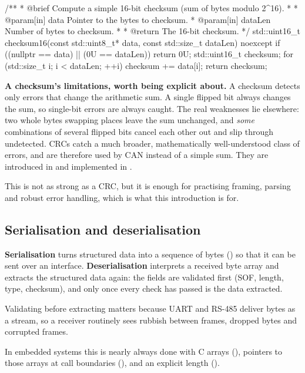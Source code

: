 \begin{cppcode}
/**
 * @brief Compute a simple 16-bit checksum (sum of bytes modulo 2^16).
 *
 * @param[in] data Pointer to the bytes to checksum.
 * @param[in] dataLen Number of bytes to checksum.
 *
 * @return The 16-bit checksum.
 */
std::uint16_t checksum16(const std::uint8_t* data, const std::size_t dataLen) noexcept
{
    if ((nullptr == data) || (0U == dataLen)) { return 0U; }
    std::uint16_t checksum{};
    for (std::size_t i{}; i < dataLen; ++i) { checksum += data[i]; }
    return checksum;
}
\end{cppcode}

\begin{warning}
\textbf{A checksum's limitations, worth being explicit about.} A checksum detects only errors that
change the arithmetic sum. A single flipped bit always changes the sum, so single-bit errors are
always caught. The real weaknesses lie elsewhere: two whole bytes swapping places leave the sum
unchanged, and \emph{some} combinations of several flipped bits cancel each other out and slip
through undetected. CRCs catch a much broader, mathematically well-understood class of errors, and
are therefore used by CAN instead of a simple sum. They are introduced in
 and implemented in .
\end{warning}

This is not as strong as a CRC, but it is enough for practising framing, parsing and robust error
handling, which is what this introduction is for.

\subsection*{Serialisation and deserialisation}
\textbf{Serialisation} turns structured data into a sequence of bytes () so
that it can be sent over an interface. \textbf{Deserialisation} interprets a received byte array and
extracts the structured data again: the fields are validated first (SOF, length, type, checksum),
and only once every check has passed is the data extracted.

Validating before extracting matters because UART and RS-485 deliver bytes as a stream, so a
receiver routinely sees rubbish between frames, dropped bytes and corrupted frames.

In embedded systems this is nearly always done with C arrays (),
pointers to those arrays at call boundaries (), and an explicit length
().

